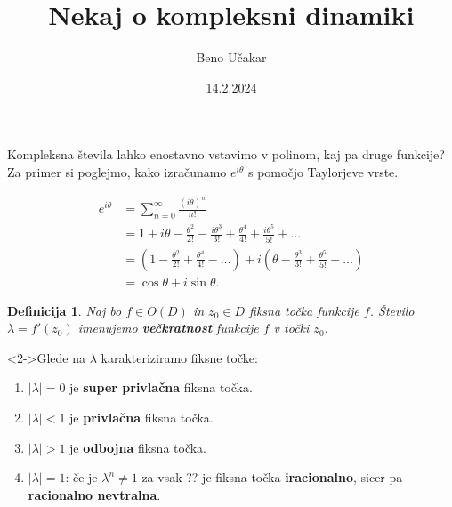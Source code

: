 \documentclass{beamer}
\title{Nekaj o kompleksni dinamiki}
\author{Beno Učakar}
\date{14.2.2024}
\institute{Fakulteta za matematiko in fiziko}
\newtheorem{definicija}{Definicija}}
\begin{document}
\maketitle


\begin{frame}
    Kompleksna števila lahko enostavno vstavimo v polinom, kaj pa druge funkcije? 
    Za primer si poglejmo, kako izračunamo $e^{i\theta}$ s pomočjo Taylorjeve vrste.
    
    \begin{align*}
        e^{i\theta} & = \sum_{n=0}^{\infty} \frac{(i\theta)^n}{n!} \\
        & = 1 + i\theta - \frac{\theta^2}{2!} - \frac{i\theta^3}{3!} + \frac{\theta^4}{4!} + \frac{i\theta^5}{5!} + \ldots \\
        & = \left( 1 - \frac{\theta^2}{2!} + \frac{\theta^4}{4!} - \ldots \right) 
        + i \left(\theta - \frac{\theta^3}{3!} + \frac{\theta^5}{5!} - \ldots \right) \\
        & = \cos{\theta} + i\sin{\theta}.
    \end{align*}
\end{frame}

\begin{frame}

    \begin{definicija}
       \emph{Naj bo $f \in O(D)$ in $z_0 \in D$ fiksna točka funkcije $f$.
       Število $\lambda = f'(z_0)$ imenujemo \textbf{večkratnost} funkcije $f$ v točki $z_0$.}
    \end{definicija}
    

    \begin{exampleblock}<2->{Glede na $\lambda$ karakteriziramo fiksne točke:}
        \begin{enumerate} 
            \item $|\lambda| = 0$ je \textbf{super privlačna} fiksna točka.
            \item<3-> $|\lambda| < 1$ je \textbf{privlačna} fiksna točka.
            \item<4-> $|\lambda| > 1$ je \textbf{odbojna} fiksna točka.
            \item<5-> $|\lambda| = 1$: 
                če je $\lambda^n \neq 1$ za vsak ?? je fiksna točka \textbf{iracionalno},
                sicer pa \textbf{racionalno nevtralna}.
        \end{enumerate}
    \end{exampleblock}
\end{frame}
\end{document}
